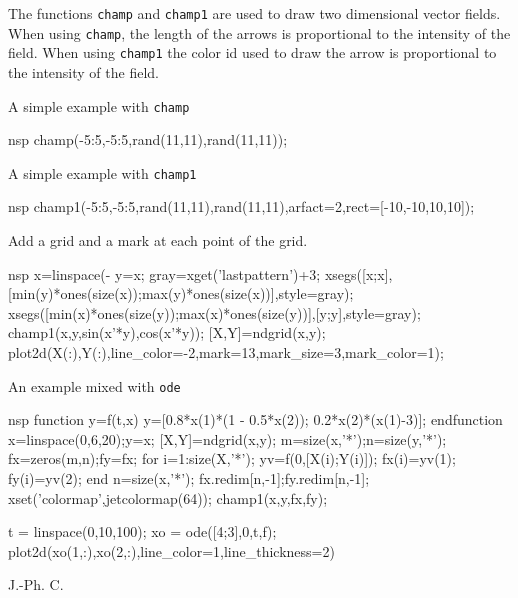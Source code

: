 \begin{mandescription}
  The functions \verb!champ! and \verb!champ1! are used to draw two dimensional
  vector fields. When using \verb!champ!, the length of the arrows is proportional to the intensity of the field.
  When using \verb!champ1! the color id used to draw the arrow is proportional to the intensity of the field.
\end{mandescription}
\begin{examples}

  \noindent A simple example with \verb!champ!
  \begin{mintednsp}{nsp}
    champ(-5:5,-5:5,rand(11,11),rand(11,11));
  \end{mintednsp}
  \noindent A simple example with \verb!champ1!
  \begin{mintednsp}{nsp}
    champ1(-5:5,-5:5,rand(11,11),rand(11,11),arfact=2,rect=[-10,-10,10,10]);
  \end{mintednsp}
  \noindent Add a grid and a mark at each point of the grid.
  \begin{mintednsp}{nsp}
    x=linspace(-%
    y=x;
    gray=xget('lastpattern')+3;
    xsegs([x;x],[min(y)*ones(size(x));max(y)*ones(size(x))],style=gray);
    xsegs([min(x)*ones(size(y));max(x)*ones(size(y))],[y;y],style=gray);
    champ1(x,y,sin(x'*y),cos(x'*y));
    [X,Y]=ndgrid(x,y);
    plot2d(X(:),Y(:),line_color=-2,mark=13,mark_size=3,mark_color=1);
  \end{mintednsp}

  \noindent An example mixed with \verb!ode!

  \begin{mintednsp}{nsp}
    function y=f(t,x)
      y=[0.8*x(1)*(1 - 0.5*x(2));
      0.2*x(2)*(x(1)-3)];
    endfunction
    x=linspace(0,6,20);y=x;
    [X,Y]=ndgrid(x,y);
    m=size(x,'*');n=size(y,'*');
    fx=zeros(m,n);fy=fx;
    for i=1:size(X,'*');
      yv=f(0,[X(i);Y(i)]);
      fx(i)=yv(1); fy(i)=yv(2);
    end
    n=size(x,'*');
    fx.redim[n,-1];fy.redim[n,-1];
    xset('colormap',jetcolormap(64));
    champ1(x,y,fx,fy);

    t = linspace(0,10,100);
    xo = ode([4;3],0,t,f);
    plot2d(xo(1,:),xo(2,:),line_color=1,line_thickness=2)
  \end{mintednsp}

\end{examples}
\begin{authors}
  J.-Ph. C.
\end{authors}
